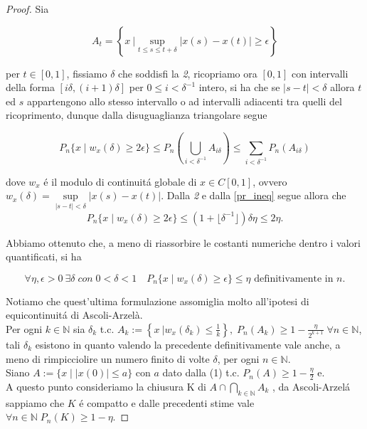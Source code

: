 \documentclass[11pt, twoside]{report}
\theoremstyle{definition}
\theoremstyle{plain}
\theoremstyle{remark}
\numberwithin{equation}{chapter}
\begin{document}
\begin{proof}{} Sia 

$$A_t=\left\{x \ \Bigg| \sup\limits_{t\leq s\leq t+\delta}|x(s)-x(t)| \geq \epsilon \right\}$$ 

per $t \in [0,1]$, fissiamo $\delta$ che soddisfi la \textit{2}, ricopriamo ora $[0,1]$ con intervalli della forma $[i\delta, (i+1)\delta]$ per $0\leq i<\delta^{-1}$ intero, si ha che se $|s-t|<\delta$ allora $t$ ed $s$ appartengono allo stesso intervallo o ad intervalli adiacenti tra quelli del ricoprimento, dunque dalla disuguaglianza triangolare segue

\begin{equation} \label{pr_ineq}
P_n\{x \mid w_x(\delta)\geq 2\epsilon \} \leq P_n\left(\bigcup\limits_{i<\delta^{-1}}A_{i\delta}\right) \leq \sum\limits_{i<\delta ^{-1}} P_n(A_{i\delta})
\end{equation}

dove $w_x$ \'e il modulo di continuit\'a globale di $x \in C[0,1]$, ovvero $w_x(\delta)= \sup\limits_{|s-t|< \delta} |x(s) - x(t)|$. Dalla \textit{2} e dalla \eqref{pr_ineq} segue allora che
\begin{equation}
P_n\{x \mid w_x(\delta)\geq 2\epsilon \} \leq (1+ \lfloor \delta^{-1} \rfloor)\delta \eta \leq 2\eta.
\end{equation}

Abbiamo ottenuto che, a meno di riassorbire le costanti numeriche dentro i valori quantificati, si ha

 $$ \forall \eta, \epsilon >0 \  \exists \delta \; con \;  0< \delta <1 \quad  P_n\{x \mid w_x(\delta)\geq \epsilon \} \leq \eta  \text{ definitivamente in } n. $$
 
 Notiamo che quest'ultima formulazione assomiglia molto all'ipotesi di equicontinuit\'a di Ascoli-Arzelà.\\
Per ogni $k \in \mathbb N$ sia $\delta_k$ t.c. $A_k:=\left\{ x \  \Big| w_x(\delta_k) \leq \frac{1}{k} \right\}, \; P_n(A_k) \geq 1- \frac{\eta}{2^{k+1}}\; \forall n \in \mathbb N$, tali $\delta_k$ esistono in quanto valendo la precedente definitivamente vale anche, a meno di rimpicciolire un numero finito di volte $\delta$, per ogni $ n \in \mathbb N$. \\
Siano $A:=\{x \mid |x(0)| \leq a \}$ con $a$ dato dalla (1) t.c. $P_n (A)\geq 1- \frac{\eta}{2}$ e. \\
A questo punto consideriamo la chiusura K di $ A \cap \bigcap\limits_{k \in \mathbb N} A_k $ , da Ascoli-Arzel\'a sappiamo che $K$ \'e compatto e dalle precedenti stime vale $\forall n \in \mathbb N \; P_n(K)\geq 1 - \eta$.
\end{proof}
\end{document}
